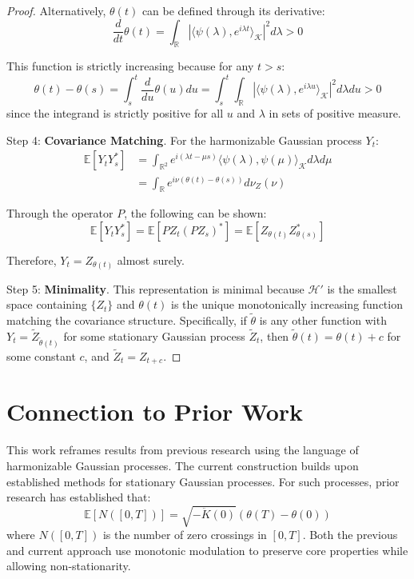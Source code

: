 \documentclass{article}
\theoremstyle{plain}
\theoremstyle{definition}
\begin{document}
\begin{proof}
Alternatively, $\theta(t)$ can be defined through its derivative:
\begin{equation}
\frac{d}{dt}\theta(t) = \int_{\mathbb{R}} |\langle \psi(\lambda), e^{i\lambda t} \rangle_{\mathcal{K}}|^2 d\lambda > 0
\end{equation}

This function is strictly increasing because for any $t > s$:
\begin{equation}
\theta(t) - \theta(s) = \int_s^t \frac{d}{du}\theta(u) du = \int_s^t \int_{\mathbb{R}} |\langle \psi(\lambda), e^{i\lambda u} \rangle_{\mathcal{K}}|^2 d\lambda du > 0
\end{equation}
since the integrand is strictly positive for all $u$ and $\lambda$ in sets of positive measure.

Step 4: \textbf{Covariance Matching}. For the harmonizable Gaussian process $Y_t$:
\begin{align}
\mathbb{E}[Y_t Y_s^*] &= \int_{\mathbb{R}^2} e^{i(\lambda t-\mu s)} \langle \psi(\lambda), \psi(\mu) \rangle_{\mathcal{K}} d\lambda d\mu \\
&= \int_{\mathbb{R}} e^{i\nu(\theta(t)-\theta(s))} d\nu_Z(\nu)
\end{align}

Through the operator $P$, the following can be shown:
\begin{equation}
\mathbb{E}[Y_t Y_s^*] = \mathbb{E}[PZ_t (PZ_s)^*] = \mathbb{E}[Z_{\theta(t)} Z_{\theta(s)}^*]
\end{equation}

Therefore, $Y_t = Z_{\theta(t)}$ almost surely.

Step 5: \textbf{Minimality}. This representation is minimal because $\mathcal{H}'$ is the smallest space containing $\{Z_t\}$ and $\theta(t)$ is the unique monotonically increasing function matching the covariance structure. Specifically, if $\tilde{\theta}$ is any other function with $Y_t = \tilde{Z}_{\tilde{\theta}(t)}$ for some stationary Gaussian process $\tilde{Z}_t$, then $\tilde{\theta}(t) = \theta(t) + c$ for some constant $c$, and $\tilde{Z}_t = Z_{t+c}$.
\end{proof}

\section{Connection to Prior Work}

This work reframes results from previous research \cite{crowley} using the language of harmonizable Gaussian processes. The current construction builds upon established methods for stationary Gaussian processes. For such processes, prior research has established that:
\begin{equation}
\mathbb{E}[N([0,T])] = \sqrt{-\ddot{K}(0)}(\theta(T)-\theta(0))
\end{equation}
where $N([0,T])$ is the number of zero crossings in $[0,T]$. Both the previous and current approach use monotonic modulation to preserve core properties while allowing non-stationarity.
\end{document}
